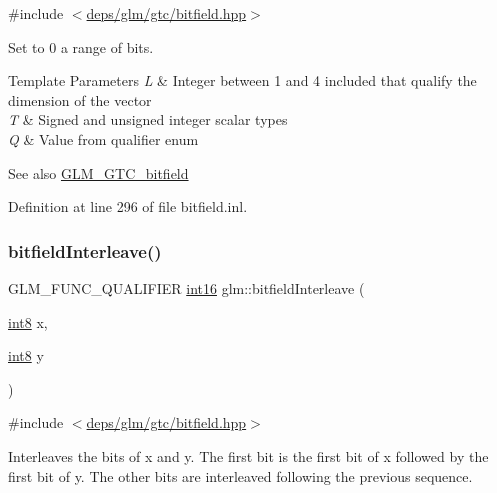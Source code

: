 {\ttfamily \#include $<$\hyperlink{bitfield_8hpp}{deps/glm/gtc/bitfield.\+hpp}$>$}

Set to 0 a range of bits.


\begin{DoxyTemplParams}{Template Parameters}
{\em L} & Integer between 1 and 4 included that qualify the dimension of the vector \\
\hline
{\em T} & Signed and unsigned integer scalar types \\
\hline
{\em Q} & Value from qualifier enum\\
\hline
\end{DoxyTemplParams}
\begin{DoxySeeAlso}{See also}
\hyperlink{group__gtc__bitfield}{G\+L\+M\+\_\+\+G\+T\+C\+\_\+bitfield} 
\end{DoxySeeAlso}


Definition at line 296 of file bitfield.\+inl.

\mbox{\label{group__gtc__bitfield_ga479134317bc95d99f2b2e235d3db287b}} 
\subsubsection{\texorpdfstring{bitfield\+Interleave()}{bitfieldInterleave()}\hspace{0.1cm}{\footnotesize\ttfamily [1/16]}}
{\footnotesize\ttfamily G\+L\+M\+\_\+\+F\+U\+N\+C\+\_\+\+Q\+U\+A\+L\+I\+F\+I\+ER \hyperlink{group__gtc__type__precision_ga2945a61d12771f8954994fcddf02b021}{int16} glm\+::bitfield\+Interleave (\begin{DoxyParamCaption}\item[{\hyperlink{group__gtc__type__precision_ga96254f9c1c4506fc8eb5cf3301ce8565}{int8}}]{x,  }\item[{\hyperlink{group__gtc__type__precision_ga96254f9c1c4506fc8eb5cf3301ce8565}{int8}}]{y }\end{DoxyParamCaption})}



{\ttfamily \#include $<$\hyperlink{bitfield_8hpp}{deps/glm/gtc/bitfield.\+hpp}$>$}

Interleaves the bits of x and y. The first bit is the first bit of x followed by the first bit of y. The other bits are interleaved following the previous sequence.

